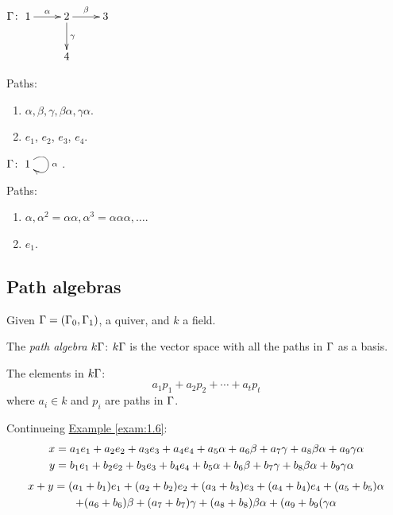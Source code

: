 \begin{exam}\label{exam:1.6}
$\G\colon \xymatrix{ 1\ar[r]^\alpha & 2 \ar[r]^\beta\ar[d]^\gamma & 3\\
& 4 & }$

Paths: 
\begin{enumerate}[\rm(i)]
\item $\alpha, \beta, \gamma, \beta\alpha, \gamma\alpha$.
\item $e_1$, $e_2$, $e_3$, $e_4$.
\end{enumerate}
\end{exam}

\begin{exam}
$\G\colon \xymatrix{1\ar@(ur,dr)[]^\alpha}$.

Paths: 
\begin{enumerate}[\rm(i)]
\item $\alpha, \alpha^2 = \alpha\alpha, \alpha^3 = \alpha\alpha\alpha, \ldots$.
\item $e_1$.
\end{enumerate}
\end{exam}

\subsection{Path algebras}

Given $\Gamma=(\Gamma_0,\Gamma_1)$, a quiver, and $k$ a field.

The \emph{path algebra} $k\Gamma$:  $k\Gamma$ is the
vector space with all the paths in $\Gamma$ as a basis. 

The elements in $k\Gamma$:
\[a_1p_1 + a_2p_2 + \cdots + a_tp_t\]
where $a_i\in k$ and $p_i$ are paths in $\Gamma$.

\begin{exam}
Continueing \hyperref[exam:1.6]{Example \ref*{exam:1.6}}:
\begin{align}
x & = a_1e_1 + a_2e_2 + a_3e_3 + a_4e_4 + a_5\alpha + a_6\beta +
a_7\gamma + a_8\beta\alpha + a_9\gamma\alpha\notag\\
y & = b_1e_1 + b_2e_2 + b_3e_3 + b_4e_4 + b_5\alpha + b_6\beta +
b_7\gamma + b_8\beta\alpha + b_9\gamma\alpha\notag
\end{align}
\begin{multline}
x + y = (a_1 + b_1)e_1 + (a_2 + b_2)e_2 + (a_3 + b_3)e_3 + (a_4 +
b_4)e_4 + (a_5 + b_5)\alpha\notag\\ 
 + (a_6 + b_6)\beta + (a_7 + b_7)\gamma
+ (a_8 + b_8)\beta\alpha + (a_9 + b_9(\gamma\alpha\notag
\end{multline}
\end{exam}

